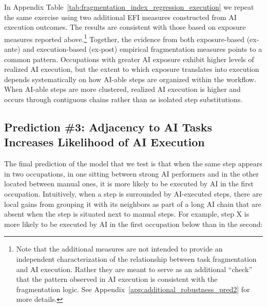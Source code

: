 In Appendix Table~\ref{tab:fragmentation_index_regression_execution} we repeat the same exercise using two additional EFI measures constructed from AI execution outcomes. 
The results are consistent with those based on exposure measures reported above.\footnote{
Note that the additional measures are not intended to provide an independent characterization of the relationship between task fragmentation and AI execution. 
Rather they are meant to serve as an additional ``check'' that the pattern observed in AI execution is consistent with the fragmentation logic.
See Appendix~\ref{app:additional_robustness_pred2} for more details.
}
Together, the evidence from both exposure-based (ex-ante) and execution-based (ex-post) empirical fragmentation measures points to a common pattern.  
Occupations with greater AI exposure exhibit higher levels of realized AI execution, but the extent to which exposure translates into execution depends systematically on how AI-able steps are organized within the workflow.  
When AI-able steps are more clustered, realized AI execution is higher and occurs through contiguous chains rather than as isolated step substitutions.  




\subsection{Prediction \#3: Adjacency to AI Tasks Increases Likelihood of AI Execution}
\label{sec:DWA_prediction}

The final prediction of the model that we test is that when the same step appears in two occupations, in one sitting between strong AI performers and in the other located between manual ones, it is more likely to be executed by AI in the first occupation.
Intuitively, when a step is surrounded by AI-executed steps, there are local gains from grouping it with its neighbors as part of a long AI chain that are absent when the step is situated next to manual steps.
For example, step X is more likely to be executed by AI in the first occupation below than in the second: \\




